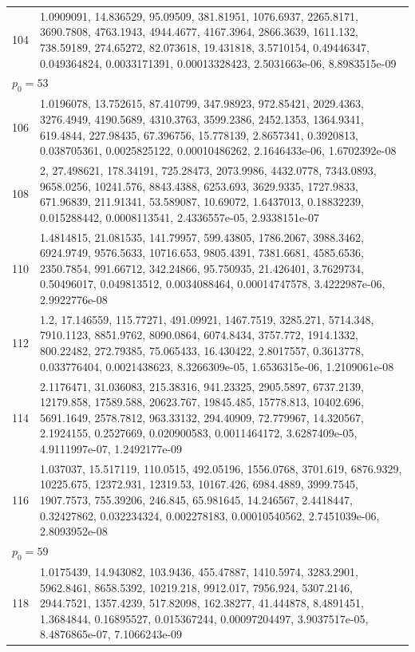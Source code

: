 \documentclass[11pt]{article}
\theoremstyle{definition}
\theoremstyle{remark}
\begin{document}
{\begin{longtable}{r p{}}
104 & 1.0909091, 14.836529, 95.09509, 381.81951, 1076.6937, 2265.8171, 3690.7808, 4763.1943, 4944.4677, 4167.3964, 2866.3639, 1611.132, 738.59189, 274.65272, 82.073618, 19.431818, 3.5710154, 0.49446347, 0.049364824, 0.0033171391, 0.00013328423, 2.5031663e-06, 8.8983515e-09 \\
\multicolumn{2}{l}{$p_0 = 53$} \\
106 & 1.0196078, 13.752615, 87.410799, 347.98923, 972.85421, 2029.4363, 3276.4949, 4190.5689, 4310.3763, 3599.2386, 2452.1353, 1364.9341, 619.4844, 227.98435, 67.396756, 15.778139, 2.8657341, 0.3920813, 0.038705361, 0.0025825122, 0.00010486262, 2.1646433e-06, 1.6702392e-08 \\
108 & 2, 27.498621, 178.34191, 725.28473, 2073.9986, 4432.0778, 7343.0893, 9658.0256, 10241.576, 8843.4388, 6253.693, 3629.9335, 1727.9833, 671.96839, 211.91341, 53.589087, 10.69072, 1.6437013, 0.18832239, 0.015288442, 0.0008113541, 2.4336557e-05, 2.9338151e-07 \\
110 & 1.4814815, 21.081535, 141.79957, 599.43805, 1786.2067, 3988.3462, 6924.9749, 9576.5633, 10716.653, 9805.4391, 7381.6681, 4585.6536, 2350.7854, 991.66712, 342.24866, 95.750935, 21.426401, 3.7629734, 0.50496017, 0.049813512, 0.0034088464, 0.00014747578, 3.4222987e-06, 2.9922776e-08 \\
112 & 1.2, 17.146559, 115.77271, 491.09921, 1467.7519, 3285.271, 5714.348, 7910.1123, 8851.9762, 8090.0864, 6074.8434, 3757.772, 1914.1332, 800.22482, 272.79385, 75.065433, 16.430422, 2.8017557, 0.3613778, 0.033776404, 0.0021438623, 8.3266309e-05, 1.6536315e-06, 1.2109061e-08 \\
114 & 2.1176471, 31.036083, 215.38316, 941.23325, 2905.5897, 6737.2139, 12179.858, 17589.588, 20623.767, 19845.485, 15778.813, 10402.696, 5691.1649, 2578.7812, 963.33132, 294.40909, 72.779967, 14.320567, 2.1924155, 0.2527669, 0.020900583, 0.0011464172, 3.6287409e-05, 4.9111997e-07, 1.2492177e-09 \\
116 & 1.037037, 15.517119, 110.0515, 492.05196, 1556.0768, 3701.619, 6876.9329, 10225.675, 12372.931, 12319.53, 10167.426, 6984.4889, 3999.7545, 1907.7573, 755.39206, 246.845, 65.981645, 14.246567, 2.4418447, 0.32427862, 0.032234324, 0.002278183, 0.00010540562, 2.7451039e-06, 2.8093952e-08 \\
\multicolumn{2}{l}{$p_0 = 59$} \\
118 & 1.0175439, 14.943082, 103.9436, 455.47887, 1410.5974, 3283.2901, 5962.8461, 8658.5392, 10219.218, 9912.017, 7956.924, 5307.2146, 2944.7521, 1357.4239, 517.82098, 162.38277, 41.444878, 8.4891451, 1.3684844, 0.16895527, 0.015367244, 0.00097204497, 3.9037517e-05, 8.4876865e-07, 7.1066243e-09 \\

\end{longtable}}
\end{document}
